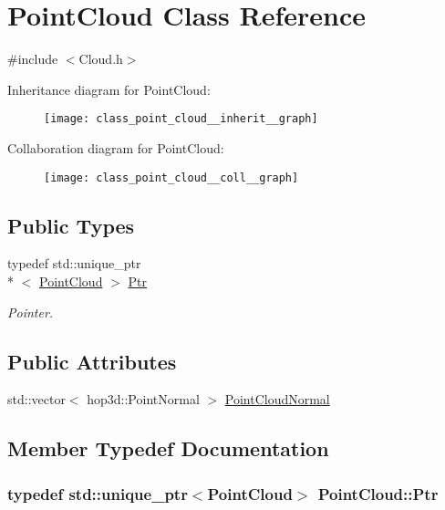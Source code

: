 \hypertarget{class_point_cloud}{\section{Point\-Cloud Class Reference}
\label{class_point_cloud}
}


{\ttfamily \#include $<$Cloud.\-h$>$}



Inheritance diagram for Point\-Cloud\-:\nopagebreak
\begin{figure}[H]
\begin{center}
\leavevmode
\texttt{[image: class\_point\_cloud\_\_inherit\_\_graph]}
\end{center}
\end{figure}


Collaboration diagram for Point\-Cloud\-:\nopagebreak
\begin{figure}[H]
\begin{center}
\leavevmode
\texttt{[image: class\_point\_cloud\_\_coll\_\_graph]}
\end{center}
\end{figure}
\subsection*{Public Types}
\begin{DoxyCompactItemize}
\item 
typedef std\-::unique\-\_\-ptr\\*
$<$ \hyperlink{class_point_cloud}{Point\-Cloud} $>$ \hyperlink{class_point_cloud_a150100920ea0a97f6867259251683256}{Ptr}
\begin{DoxyCompactList}\small\item\em Pointer. \end{DoxyCompactList}\end{DoxyCompactItemize}
\subsection*{Public Attributes}
\begin{DoxyCompactItemize}
\item 
std\-::vector$<$ hop3d\-::\-Point\-Normal $>$ \hyperlink{class_point_cloud_a96c71850c381b10db6a01ff979f1b6a5}{Point\-Cloud\-Normal}
\end{DoxyCompactItemize}


\subsection{Member Typedef Documentation}
\hypertarget{class_point_cloud_a150100920ea0a97f6867259251683256}{
\subsubsection[{Ptr}]{\setlength{\rightskip}{0pt plus 5cm}typedef std\-::unique\-\_\-ptr$<${\bf Point\-Cloud}$>$ {\bf Point\-Cloud\-::\-Ptr}}}\label{class_point_cloud_a150100920ea0a97f6867259251683256}


